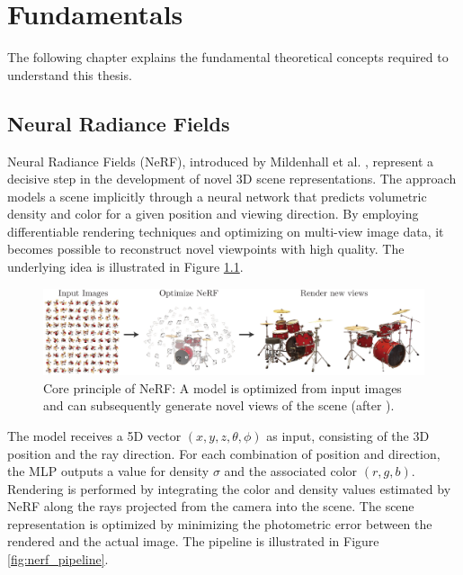 \chapter{Fundamentals}
\label{chap:Fundamentals}

The following chapter explains the fundamental theoretical concepts required to understand this thesis.


\section{Neural Radiance Fields}
\label{sec:Fundamentals_NeRF}

Neural Radiance Fields (NeRF), introduced by Mildenhall et al. \cite{mildenhall2021nerf}, represent a decisive step in the development of novel 3D scene representations.
The approach models a scene implicitly through a neural network that predicts volumetric density and color for a given position and viewing direction.
By employing differentiable rendering techniques and optimizing on multi-view image data, it becomes possible to reconstruct novel viewpoints with high quality.
The underlying idea is illustrated in Figure \ref{fig:nerf_teaser}.

\begin{figure}[h]
    \centering
    \includegraphics[width=1\linewidth]{Grafiken/Fundamentals/teaser_small.pdf}
    \caption{Core principle of NeRF: A model is optimized from input images and can subsequently generate novel views of the scene (after \cite{mildenhall2021nerf}).}
    \label{fig:nerf_teaser}
\end{figure}

The model receives a 5D vector \((x, y, z, \theta, \phi)\) as input, consisting of the 3D position and the ray direction. 
For each combination of position and direction, the MLP outputs a value for density \(\sigma\) and the associated color \((r, g, b)\).
Rendering is performed by integrating the color and density values estimated by NeRF along the rays projected from the camera into the scene.
The scene representation is optimized by minimizing the photometric error between the rendered and the actual image.
The pipeline is illustrated in Figure \ref{fig:nerf_pipeline}.


